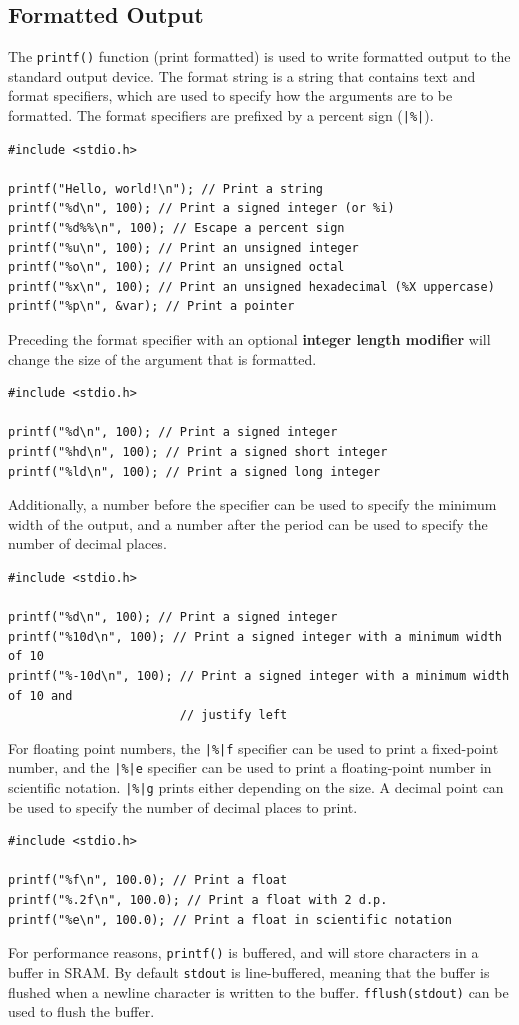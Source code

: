 \documentclass[a4paper]{report}
\begin{document}
\subsection{Formatted Output}
The \texttt{printf()} function (print formatted) is used to write formatted output to the standard output device. The format string is a string that contains
text and format specifiers, which are used to specify how the arguments are to be formatted. The format specifiers are prefixed by a percent sign (\texttt{|\%|}).
\begin{verbatim}
#include <stdio.h>

printf("Hello, world!\n"); // Print a string
printf("%d\n", 100); // Print a signed integer (or %i)
printf("%d%%\n", 100); // Escape a percent sign
printf("%u\n", 100); // Print an unsigned integer
printf("%o\n", 100); // Print an unsigned octal
printf("%x\n", 100); // Print an unsigned hexadecimal (%X uppercase)
printf("%p\n", &var); // Print a pointer
\end{verbatim}
Preceding the format specifier with an optional \textbf{integer length modifier} will change the size of the argument that is formatted.
\begin{verbatim}
#include <stdio.h>

printf("%d\n", 100); // Print a signed integer
printf("%hd\n", 100); // Print a signed short integer
printf("%ld\n", 100); // Print a signed long integer
\end{verbatim}
Additionally, a number before the specifier can be used to specify the minimum width of the output, and a number after the period can be used to specify the number of decimal places.
\begin{verbatim}
#include <stdio.h>

printf("%d\n", 100); // Print a signed integer
printf("%10d\n", 100); // Print a signed integer with a minimum width of 10
printf("%-10d\n", 100); // Print a signed integer with a minimum width of 10 and
                        // justify left
\end{verbatim}
For floating point numbers, the \texttt{|\%|f} specifier can be used to print a fixed-point number, and the \texttt{|\%|e} specifier can be used to print a floating-point number in scientific notation.
\texttt{|\%|g} prints either depending on the size.
A decimal point can be used to specify the number of decimal places to print.
\begin{verbatim}
#include <stdio.h>

printf("%f\n", 100.0); // Print a float
printf("%.2f\n", 100.0); // Print a float with 2 d.p.
printf("%e\n", 100.0); // Print a float in scientific notation
\end{verbatim}
For performance reasons, \texttt{printf()} is buffered, and will store characters in a buffer in SRAM\@. By default \texttt{stdout}
is line-buffered, meaning that the buffer is flushed when a newline character is written to the buffer. \texttt{fflush(stdout)} can be used to flush the buffer.
\end{document}
